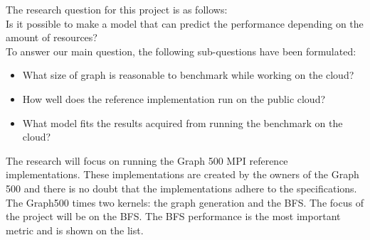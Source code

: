 The research question for this project is as follows: \\
Is it possible to make a model that can predict the performance depending on the amount of resources? \\
To answer our main question, the following sub-questions have been formulated: 
\begin{itemize}
\item What size of graph is reasonable to benchmark while working on the cloud?
\item How well does the reference implementation\cite{graph500-code} run on the public cloud?
\item What model fits the results acquired from running the benchmark on the cloud?
\end{itemize}

The research will focus on running the Graph 500 MPI reference implementations. These implementations are created by the owners of the Graph 500 and there is no doubt that the implementations adhere to the specifications. The Graph500 times two kernels: the graph generation and the BFS. The focus of the project will be on the BFS. The BFS performance is the most important metric and is shown on the list.